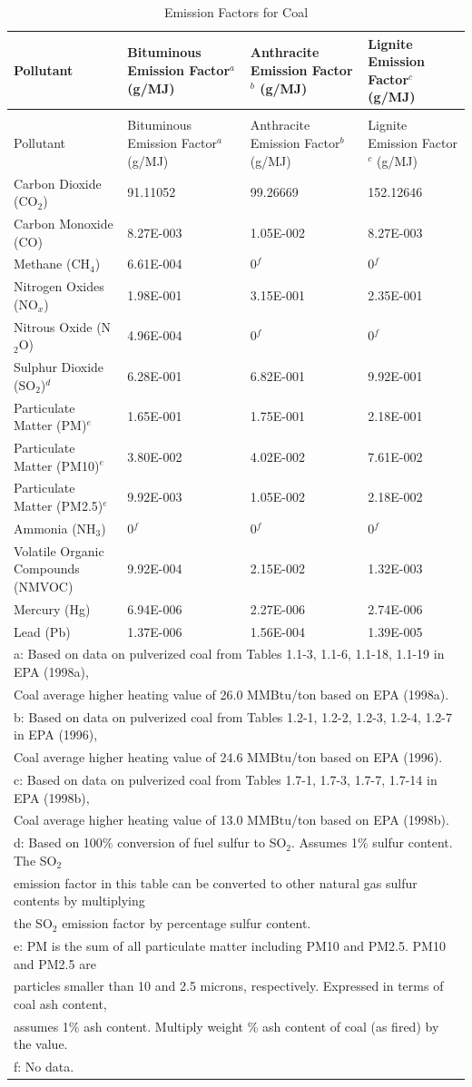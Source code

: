 \begin{longtable}[c]{p{1.5in}p{1.5in}p{1.5in}p{1.5in}}
\caption{Emission Factors for Coal \label{table:emission-factors-for-coal}} \tabularnewline
\toprule 
Pollutant & Bituminous Emission Factor\(^a\)   (g/MJ) & Anthracite Emission Factor\(^b\)   (g/MJ) & Lignite Emission Factor\(^c\)   (g/MJ) \tabularnewline
\midrule
\endfirsthead

\caption[]{Emission Factors for Coal} \tabularnewline
\toprule 
Pollutant & Bituminous Emission Factor\(^a\)   (g/MJ) & Anthracite Emission Factor\(^b\)   (g/MJ) & Lignite Emission Factor\(^c\)   (g/MJ) \tabularnewline
\midrule
\endhead

Carbon Dioxide (CO\(_2\)) & 91.11052 & 99.26669 & 152.12646 \tabularnewline
Carbon Monoxide (CO) & 8.27E-003 & 1.05E-002 & 8.27E-003 \tabularnewline
Methane (CH\(_4\)) & 6.61E-004 & 0\(^f\) & 0\(^f\) \tabularnewline
Nitrogen Oxides (NO\(_x\)) & 1.98E-001 & 3.15E-001 & 2.35E-001 \tabularnewline
Nitrous Oxide (N\(_2\)O) & 4.96E-004 & 0\(^f\) & 0\(^f\) \tabularnewline
Sulphur Dioxide (SO\(_2\))\(^d\) & 6.28E-001 & 6.82E-001 & 9.92E-001 \tabularnewline
Particulate Matter (PM)\(^e\) & 1.65E-001 & 1.75E-001 & 2.18E-001 \tabularnewline
Particulate Matter (PM10)\(^e\) & 3.80E-002 & 4.02E-002 & 7.61E-002 \tabularnewline
Particulate Matter (PM2.5)\(^e\) & 9.92E-003 & 1.05E-002 & 2.18E-002 \tabularnewline
Ammonia (NH\(_3\)) & 0\(^f\) & 0\(^f\) & 0\(^f\) \tabularnewline
Volatile Organic Compounds (NMVOC) & 9.92E-004 & 2.15E-002 & 1.32E-003 \tabularnewline
Mercury (Hg) & 6.94E-006 & 2.27E-006 & 2.74E-006 \tabularnewline
Lead (Pb) & 1.37E-006 & 1.56E-004 & 1.39E-005 \tabularnewline
\midrule
\multicolumn{4}{l}{a: Based on data on pulverized coal from Tables 1.1-3, 1.1-6, 1.1-18, 1.1-19 in EPA (1998a),} \tabularnewline
\multicolumn{4}{l}{Coal average higher heating value of 26.0 MMBtu/ton based on EPA (1998a).} \tabularnewline
\multicolumn{4}{l}{b: Based on data on pulverized coal from Tables 1.2-1, 1.2-2, 1.2-3, 1.2-4, 1.2-7 in EPA (1996),} \tabularnewline
\multicolumn{4}{l}{Coal average higher heating value of 24.6 MMBtu/ton based on EPA (1996).} \tabularnewline
\multicolumn{4}{l}{c: Based on data on pulverized coal from Tables 1.7-1, 1.7-3, 1.7-7, 1.7-14 in EPA (1998b),} \tabularnewline
\multicolumn{4}{l}{Coal average higher heating value of 13.0 MMBtu/ton based on EPA (1998b).} \tabularnewline
\multicolumn{4}{l}{d: Based on 100\% conversion of fuel sulfur to SO\(_2\). Assumes 1\% sulfur content. The SO\(_2\)} \tabularnewline
\multicolumn{4}{l}{emission factor in this table can be converted to other natural gas sulfur contents by multiplying} \tabularnewline
\multicolumn{4}{l}{the SO\(_2\) emission factor by percentage sulfur content.} \tabularnewline
\multicolumn{4}{l}{e: PM is the sum of all particulate matter including PM10 and PM2.5. PM10 and PM2.5 are} \tabularnewline
\multicolumn{4}{l}{particles smaller than 10 and 2.5 microns, respectively. Expressed in terms of coal ash content,} \tabularnewline
\multicolumn{4}{l}{assumes 1\% ash content. Multiply weight \% ash content of coal (as fired) by the value.} \tabularnewline
\multicolumn{4}{l}{f: No data.} \tabularnewline
\bottomrule
\end{longtable}

